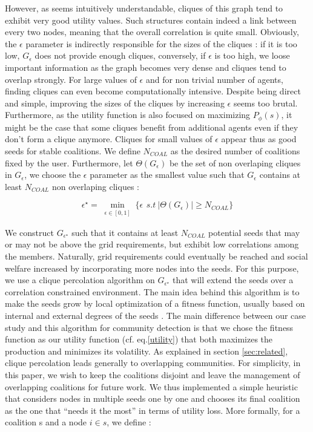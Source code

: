 \documentclass[conference]{IEEEtran}
\begin{document}
However, as seems intuitively understandable, cliques of this graph tend to exhibit very good utility values. Such  structures contain indeed a link between every two nodes, meaning that the overall correlation is quite small. Obviously, the $ \epsilon $ parameter is indirectly responsible for the sizes of the cliques : if it is too low, $ G_{\epsilon} $ does not provide enough cliques, conversely, if $\epsilon $ is too high, we loose important information as the graph becomes very dense and cliques tend to overlap strongly. For large values of $ \epsilon $ and for non trivial number of agents, finding cliques can even become computationally intensive. Despite being direct and simple, improving the sizes of the cliques by increasing $ \epsilon $ seems too brutal. Furthermore, as the utility function is also focused on maximizing $ P_{\phi}(s) $, it might be the case that some cliques benefit from additional agents even if they don't form a clique anymore. Cliques for small values of $ \epsilon $ appear thus as good seeds for stable coalitions. We define $ N_{COAL} $ as the desired number of coalitions fixed by the user. Furthermore, let $ \Theta(G_{\epsilon}) $ be the set of non overlaping cliques in $ G_{\epsilon} $, we choose the $ \epsilon $ parameter as the smallest value such that $ G_{\epsilon} $ contains at least $ N_{COAL} $ non overlaping cliques :

\begin{equation}
\epsilon^{\star} = \min_{\substack{ \epsilon \in [0,1] }} \Big\{ \epsilon\,\ s.t\ |\Theta(G_{\epsilon})| \geq N_{COAL} \Big\}
\end{equation}

We construct $ G_{\epsilon^{\star}} $ such that it contains at least $ N_{COAL} $ potential seeds that may or may not be above the grid requirements, but exhibit low correlations among the members. Naturally, grid requirements could eventually be reached and social welfare increased by incorporating more nodes into the seeds. For this purpose, we use a clique percolation algorithm on $ G_{\epsilon^{\star}} $ that will extend the seeds over a correlation constrained environment. The main idea behind this algorithm is to make the seeds grow by local optimization of a fitness function, usually based on internal and external degrees of the seeds \cite{Lancichinetti}. The main difference between our case study and this algorithm for community detection is that we chose the fitness function as our utility function (cf. eq.\eqref{utility}) that both maximizes the production and minimizes its volatility. As explained in section \ref{sec:related}, clique percolation leads generally to overlapping communities. For simplicity, in this paper, we wish to keep the coalitions disjoint and  leave the management of overlapping coalitions for future work. We thus implemented a simple heuristic that considers nodes in multiple seeds one by one and chooses its final coalition as the one that “needs it the most” in terms of utility loss. More formally, for a coalition s and a node $ i \in s $, we define :
\end{document}
